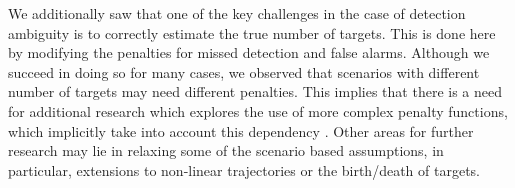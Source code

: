 We additionally saw that one of the key challenges in the case of detection ambiguity is to correctly estimate the true number of targets. This is done here by modifying the penalties for missed detection and false alarms. Although we succeed in doing so for many cases, we observed that scenarios with different number of targets may need different penalties. This implies that there is a need for additional research which explores the use of more complex penalty functions, which implicitly take into account this dependency . %
Other areas for further research may lie in relaxing some of the scenario based assumptions, in particular, extensions to non-linear trajectories or the birth/death of targets. 